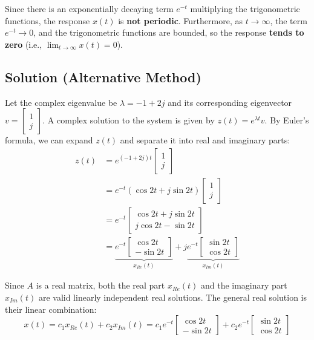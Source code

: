 \documentclass[12pt,a4paper]{article}
\begin{document}
	Since there is an exponentially decaying term $e^{-t}$ multiplying the trigonometric functions, the response $x(t)$ is \textbf{not periodic}. 
	Furthermore, as $t \to \infty$, the term $e^{-t} \to 0$, and the trigonometric functions are bounded, so the response \textbf{tends to zero} (i.e., $\lim_{t \to \infty} x(t) = 0$).

\clearpage
\subsection*{Solution (Alternative Method)}

Let the complex eigenvalue be $\lambda = -1 + 2j$ and its corresponding eigenvector $v = \begin{bmatrix} 1 \\ j \end{bmatrix}$.
A complex solution to the system is given by $z(t) = e^{\lambda t}v$.
By Euler's formula, we can expand $z(t)$ and separate it into real and imaginary parts:
\begin{align*}
	z(t) &= e^{(-1+2j)t} \begin{bmatrix} 1 \\ j \end{bmatrix} \\
	&= e^{-t}(\cos 2t + j\sin 2t) \begin{bmatrix} 1 \\ j \end{bmatrix} \\
	&= e^{-t} \begin{bmatrix} \cos 2t + j\sin 2t \\ j\cos 2t - \sin 2t \end{bmatrix} \\
	&= \underbrace{e^{-t} \begin{bmatrix} \cos 2t \\ -\sin 2t \end{bmatrix}}_{x_{Re}(t)} + j \underbrace{e^{-t} \begin{bmatrix} \sin 2t \\ \cos 2t \end{bmatrix}}_{x_{Im}(t)}
\end{align*}

Since $A$ is a real matrix, both the real part $x_{Re}(t)$ and the imaginary part $x_{Im}(t)$ are valid linearly independent real solutions. The general real solution is their linear combination:
\[
x(t) = c_1 x_{Re}(t) + c_2 x_{Im}(t) = c_1 e^{-t} \begin{bmatrix} \cos 2t \\ -\sin 2t \end{bmatrix} + c_2 e^{-t} \begin{bmatrix} \sin 2t \\ \cos 2t \end{bmatrix}
\]
\end{document}
